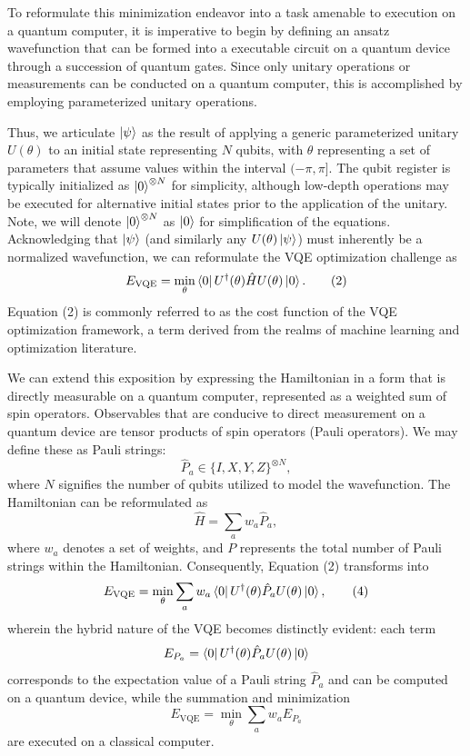 \documentclass[%
 reprint,
 amsmath,amssymb,
 aps,
]{revtex4-2}
\begin{document}
To reformulate this minimization endeavor into a task amenable to execution on a quantum computer, it is imperative to begin by defining an ansatz wavefunction that can be formed into a executable circuit on a quantum device through a succession of quantum gates. Since only unitary operations or measurements can be conducted on a quantum computer, this is accomplished by employing parameterized unitary operations. 

Thus, we articulate $\ket{\psi}$ as the result of applying a generic parameterized unitary $U(\theta)$ to an initial state representing $N$ qubits, with $\theta$ representing a set of parameters that assume values within the interval $(-\pi, \pi]$. The qubit register is typically initialized as $\ket{0}^{\otimes N}$ for simplicity, although low-depth operations may be executed for alternative initial states prior to the application of the unitary. Note, we will denote $\ket{0}^{\otimes N}$ as $\ket{0}$ for simplification of the equations. Acknowledging that $\ket{\psi}$ (and similarly any $U(\theta)\ket{\psi}$) must inherently be a normalized wavefunction, we can reformulate the VQE optimization challenge as 
\[
E_{\text{VQE}} = \min_{\theta} \bra{0}U^\dagger(\theta) \hat{H} U(\theta)\ket{0}.
\tag{2}
\]
Equation (2) is commonly referred to as the cost function of the VQE optimization framework, a term derived from the realms of machine learning and optimization literature. 

We can extend this exposition by expressing the Hamiltonian in a form that is directly measurable on a quantum computer, represented as a weighted sum of spin operators. Observables that are conducive to direct measurement on a quantum device are tensor products of spin operators (Pauli operators). We may define these as Pauli strings: 
\[
\hat{P}_a \in \{I, X, Y, Z\}^{\otimes N},
\]
where $N$ signifies the number of qubits utilized to model the wavefunction. The Hamiltonian can be reformulated as 
\[
\hat{H} = \sum_a w_a \hat{P}_a,
\tag{3}
\]
where $w_a$ denotes a set of weights, and $P$ represents the total number of Pauli strings within the Hamiltonian. Consequently, Equation (2) transforms into 
\[
E_{\text{VQE}} = \min_{\theta} \sum_a w_a \bra{0}U^\dagger(\theta) \hat{P}_a U(\theta)\ket{0},
\tag{4}
\]
wherein the hybrid nature of the VQE becomes distinctly evident: each term 
\[
E_{P_a} = \bra{0}U^\dagger(\theta) \hat{P}_a U(\theta)\ket{0}
\]
corresponds to the expectation value of a Pauli string $\hat{P}_a$ and can be computed on a quantum device, while the summation and minimization 
\[
E_{\text{VQE}} = \min_{\theta} \sum_a w_a E_{P_a}
\]
are executed on a classical computer.
\end{document}
